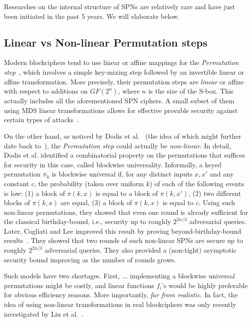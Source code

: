 Researches on the internal structure of SPNs are relatively rare and have just been initiated in the past 5 years. We will elaborate below.




\subsection{Linear vs Non-linear Permutation steps}

Modern blockciphers tend to use linear or affine mappings for the {\it Permutation step}~\cite{DBLP:reference/crypt/Biryukov11aa}, which involves a simple key-mixing step followed
by an invertible linear or affine transformation. More precisely, their permutation steps are {\it linear} or affine with respect to additions on $GF(2^n)$, where $n$ is the size of the S-box. This actually includes all the aforementioned SPN ciphers. A small subset of them using MDS linear transformations allows for effective provable security against certain types of attacks~\cite{IMA:DaeRij01,AC:PSCYL02,FSE:PSLL03,miles2015substitution,EC:SLGRL16}.



On the other hand, as noticed by Dodis et al.~\cite{EPRINT:DKSSZZ18} (the idea of which might further date back to~\cite{FSE:ChaSar06,C:Halevi07}), the {\it Permutation step} could actually be {\it non-linear}. In detail, Dodis et al. identified a combinatorial property on the permutations that suffices for security in this case, called blockwise universality. Informally, a keyed permutation $\pi_k$ is blockwise universal if, for any distinct inputs $x,x'$ and any constant $c$, the probability (taken over uniform $k$) of each of the following events is low: (1) a block of $\pi(k,x)$ is equal to a block of $\pi(k,x')$, (2) two different blocks of $\pi(k,x)$ are equal, (3) a block of $\pi(k,x)$ is equal to $c$. Using such non-linear permutations, they showed that even one round is already sufficient for the classical birthday-bound, i.e., security up to roughly $2^{2n/3}$ adversarial queries. Later, Cogliati and Lee improved this result by proving beyond-birthday-bound results~\cite{EPRINT:DKSSZZ18}. They showed that two rounds of such non-linear SPNs are secure up to roughly $2^{2n/3}$ adversarial queries. They also provided a (non-tight) asymptotic security bound improving as the number of rounds grows.



Such models have two shortages. First, ... implementing a blockwise universal permutations might be costly, and linear functions $f_i$'s would be highly preferable for obvious efficiency reasons. More importantly, {\it far from realistic}. In fact, the idea of using non-linear transformations in real blockciphers was only recently investigated by Liu et al.~\cite{DBLP:journals/dcc/LiuRL18}.



